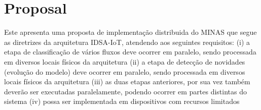 
\section{Proposal}
\label{sec:prop}



\newcommand{\minas}{MINAS\xspace}

Este apresenta uma proposta de implementação distribuida do MINAS que segue as diretrizes da arquitetura IDSA-IoT, atendendo aos seguintes requisitos:
(i) a etapa de classificação de vários fluxos deve ocorrer em paralelo, sendo processada em diversos locais físicos da arquitetura 
(ii) a etapa de detecção de novidades (evolução do modelo) deve ocorrer em paralelo, sendo processada em diversos locais físicos da arquitetura 
(iii)  as duas etapas anteriores, por sua vez também deverão ser executadas paralelamente, podendo ocorrer em partes distintas do sistema
(iv) possa ser implementada em dispositivos com recursos limitados 


